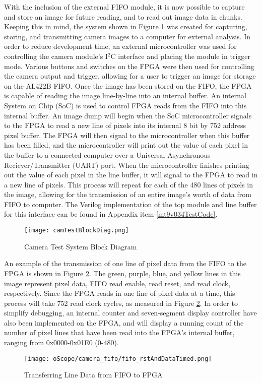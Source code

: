 With the inclusion of the external FIFO module, it is now possible to capture and store an image for future reading, and to read out image data in chunks. Keeping this in mind, the system shown in Figure \ref{camTestBDG} was created for capturing, storing, and transmitting camera images to a computer for external analysis. In order to reduce development time, an external microcontroller was used for controlling the camera module's I$^2$C interface and placing the module in trigger mode. Various buttons and switches on the FPGA were then used for controlling the camera output and trigger, allowing for a user to trigger an image for storage on the AL422B FIFO. Once the image has been stored on the FIFO, the FPGA is capable of reading the image line-by-line into an internal buffer. An internal System on Chip (SoC) is used to control FPGA reads from the FIFO into this internal buffer. An image dump will begin when the SoC microcontroller signals to the FPGA to read a new line of pixels into its internal 8 bit by 752 address pixel buffer. The FPGA will then signal to the microcontroller when this buffer has been filled, and the microcontroller will print out the value of each pixel in the buffer to a connected computer over a Universal Asynchronous Reciever/Transmitter (UART) port. When the microcontroller finishes printing out the value of each pixel in the line buffer, it will signal to the FPGA to read in a new line of pixels. This process will repeat for each of the 480 lines of pixels in the image, allowing for the transmission of an entire image's worth of data from FIFO to computer. The Verilog implementation of the top module and line buffer for this interface can be found in Appendix item \ref{mt9v034TestCode}.

\begin{figure}[H]
	\centerline{\texttt{[image: camTestBlockDiag.png]}}
	\caption{Camera Test System Block Diagram}
	\label{camTestBDG}
\end{figure}
\par
An example of the transmission of one line of pixel data from the FIFO to the FPGA is shown in Figure \ref{fifoDataOut}.  The green, purple, blue, and yellow lines in this image represent pixel data, FIFO read enable, read reset, and read clock, respectively. Since the FPGA reads in one line of pixel data at a time, this process will take 752 read clock cycles, as measured in Figure \ref{fifoDataOut}. In order to simplify debugging, an internal counter and seven-segment display controller have also been implemented on the FPGA, and will display a running count of the number of pixel lines that have been read into the FPGA's internal buffer, ranging from 0x0000-0x01E0 (0-480). 
\begin{figure}[H]
	\centerline{\texttt{[image: oScope/camera\_fifo/fifo\_rstAndDataTimed.png]}}
	\caption{Transferring Line Data from FIFO to FPGA}
	\label{fifoDataOut}
\end{figure}

